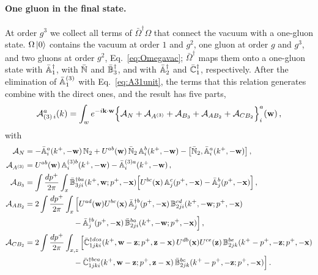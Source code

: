 \paragraph{One gluon in the final state.} At order $g^3$ we collect all terms of $\bar\Omega^\dagger\Omega$ that connect the vacuum with a one-gluon state. $\Omega\ket0$ contains the vacuum at order $1$ and $g^2$, one gluon at order $g$ and $g^3$, and two gluons at order $g^2$, Eq.~\eqref{eq:Omegavac}; $\bar\Omega^\dagger$ maps them onto a one-gluon state with $\bar{\mathbb{A}}^\dagger_1$, with $\bar{\mathbb{N}}$ and $\bar{\mathbb{B}}_3^\dagger$, and with $\bar{\mathbb{A}}_2^\dagger$ and $\bar{\mathbb{C}}_1^\dagger$, respectively. After the elimination of $\bar{\mathbb{A}}^{(3)}_1$ with Eq.~\eqref{eq:A31unit}, the terms that this relation generates combine with the direct ones, and the result has five parts,
\begin{align}\label{eq:A3amp}
\mathcal A^a_{(3)\,i}(k)=\int_w e^{-i\mathbf{k}\cdot\mathbf{w}}\Big\{\mathcal A_{N}+\mathcal A_{A^{(3)}}+\mathcal A_{B_3}+\mathcal A_{AB_2}+\mathcal A_{CB_2}\Big\}^a_i(\mathbf{w})\,,
\end{align}
with
\begin{align}\label{eq:A3parts}
\mathcal A_{N}&=-\bar{\mathbb{A}}^a_i(k^+,-\mathbf{w})\,\mathbb{N}_2+U^{ab}(\mathbf{w})\,\bar{\mathbb{N}}_2\,\mathbb{A}^b_i(k^+,-\mathbf{w})-\big[\bar{\mathbb{N}}_2,\bar{\mathbb{A}}^a_i(k^+,-\mathbf{w})\big]\,,
\notag\\
\mathcal A_{A^{(3)}}&=U^{ab}(\mathbf{w})\,\mathbb{A}^{(3)b}_i(k^+,-\mathbf{w})-\bar{\mathbb{A}}^{(3)a}_i(k^+,-\mathbf{w})\,,
\notag\\
\mathcal A_{B_3}&=\int\frac{dp^+}{2\pi}\int_x\bar{\mathbb{B}}^{\dagger ba}_{3ji}(k^+,\mathbf{w};p^+,-\mathbf{x})\Big[U^{bc}(\mathbf{x})\,\mathbb{A}^c_j(p^+,-\mathbf{x})-\bar{\mathbb{A}}^b_j(p^+,-\mathbf{x})\Big]\,,
\notag\\
\mathcal A_{AB_2}&=2\int\frac{dp^+}{2\pi}\int_x\Big[U^{ad}(\mathbf{w})U^{bc}(\mathbf{x})\,\bar{\mathbb{A}}^{\dagger b}_j(p^+,-\mathbf{x})\,\mathbb{B}^{cd}_{2ji}(k^+,-\mathbf{w};p^+,-\mathbf{x})
\notag\\&\hspace{2.2cm}
-\bar{\mathbb{A}}^{\dagger b}_j(p^+,-\mathbf{x})\,\bar{\mathbb{B}}^{ba}_{2ji}(k^+,-\mathbf{w};p^+,-\mathbf{x})\Big]\,,
\notag\\
\mathcal A_{CB_2}&=2\int\frac{dp^+}{2\pi}\int_{x,z}\Big[\bar{\mathbb{C}}^{\dagger dca}_{1jki}(k^+,\mathbf{w}-\mathbf{z};p^+,\mathbf{z}-\mathbf{x})\,U^{db}(\mathbf{x})U^{ce}(\mathbf{z})\,\mathbb{B}^{be}_{2jk}(k^+-p^+,-\mathbf{z};p^+,-\mathbf{x})
\notag\\&\hspace{2.2cm}
-\bar{\mathbb{C}}^{\dagger bca}_{1jki}(k^+,\mathbf{w}-\mathbf{z};p^+,\mathbf{z}-\mathbf{x})\,\bar{\mathbb{B}}^{bc}_{2jk}(k^+-p^+,-\mathbf{z};p^+,-\mathbf{x})\Big]\,.
\end{align}
